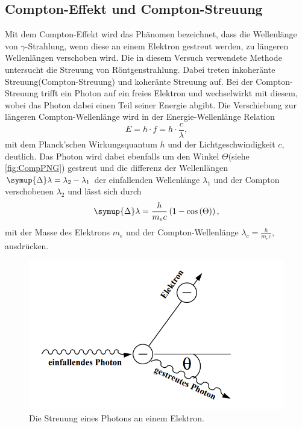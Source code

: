 \subsection{Compton-Effekt und Compton-Streuung}
Mit dem Compton-Effekt wird das Phänomen bezeichnet, dass die Wellenlänge von $\gamma$-Strahlung, wenn diese an einem Elektron gestreut werden,
zu längeren Wellenlängen verschoben wird. Die in diesem Versuch verwendete Methode untersucht die Streuung von Röntgenstrahlung. Dabei treten
inkoheränte Streuung(Compton-Streuung) und koheränte Streuung auf. Bei der Compton-Streuung trifft ein Photon auf ein freies Elektron und wechselwirkt
mit diesem, wobei das Photon dabei einen Teil seiner Energie abgibt. Die Verschiebung zur längeren Compton-Wellenlänge wird in der
Energie-Wellenlänge Relation
\begin{equation}
    \label{eqn:EHF}
    E = h\cdot f = h\cdot\frac{c}{\lambda},
\end{equation}
mit dem Planck'schen Wirkungsquantum $h$ und der Lichtgeschwindigkeit $c$, deutlich.\cite{Gerth}
Das Photon wird dabei ebenfalls um den Winkel $\Theta$(siehe \autoref{fig:CompPNG}) gestreut und die differenz der Wellenlängen $\symup{\Delta} \lambda = \lambda_2 - \lambda_1$
der einfallenden Wellenlänge $\lambda_1$ und der Compton verschobenen $\lambda_2$ und lässt sich durch
\begin{equation}
    \symup{\Delta}\lambda = \frac{h}{m_ec}\left(1-\cos\left(\Theta\right)\right),
\end{equation}
mit der Masse des Elektrons $m_e$ und der Compton-Wellenlänge $\lambda_c = \frac{h}{m_ec}$, ausdrücken.
\begin{figure}[H]
    \centering
    \includegraphics[scale=0.8]{content/Compton-Effekt.png}
    \caption{Die Streuung eines Photons an einem Elektron.\cite{sample}}
    \label{fig:CompPNG}
\end{figure}
